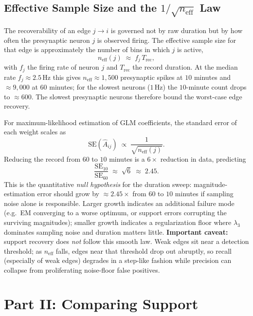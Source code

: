 \documentclass[11pt]{article}
\newcommand{\Ahat}{\hat{A}}
\newcommand{\neff}{n_{\mathrm{eff}}}
\newcommand{\Trec}{T_{\mathrm{rec}}}
\begin{document}
\subsection{Effective Sample Size and the $1/\sqrt{\neff}$ Law}
\label{sec:neff}
The recoverability of an edge $j\!\to\!i$ is governed not by raw duration but
by how often the presynaptic neuron $j$ is observed firing. The effective
sample size for that edge is approximately the number of bins in which $j$ is
active,
\begin{equation}
  \neff(j) \;\approx\; f_j \,\Trec,
\end{equation}
with $f_j$ the firing rate of neuron $j$ and $\Trec$ the record duration. At
the median rate $f_j \approx 2.5$\,Hz this gives $\neff \approx 1{,}500$
presynaptic spikes at $10$ minutes and $\approx 9{,}000$ at $60$ minutes; for
the slowest neurons ($1$\,Hz) the $10$-minute count drops to $\approx 600$.
The slowest presynaptic neurons therefore bound the worst-case edge recovery.

For maximum-likelihood estimation of GLM coefficients, the standard error of
each weight scales as
\begin{equation}
  \mathrm{SE}(\Ahat_{ij}) \;\propto\; \frac{1}{\sqrt{\neff(j)}}.
\end{equation}
Reducing the record from $60$ to $10$ minutes is a $6\times$ reduction in data,
predicting
\begin{equation}
  \frac{\mathrm{SE}_{10}}{\mathrm{SE}_{60}}
  \;\approx\; \sqrt{6} \;\approx\; 2.45.
\end{equation}
This is the quantitative \emph{null hypothesis} for the duration sweep:
magnitude-estimation error should grow by $\approx\!2.45\times$ from $60$ to
$10$ minutes if sampling noise alone is responsible. Larger growth indicates an
additional failure mode (e.g.\ EM converging to a worse optimum, or support
errors corrupting the surviving magnitudes); smaller growth indicates a
regularization floor where $\lambda_3$ dominates sampling noise and duration
matters little. \textbf{Important caveat:} support recovery does \emph{not}
follow this smooth law. Weak edges sit near a detection threshold; as $\neff$
falls, edges near that threshold drop out abruptly, so recall (especially of
weak edges) degrades in a step-like fashion while precision can collapse from
proliferating noise-floor false positives.

\section{Part II: Comparing Support}
\label{sec:support}
\end{document}
